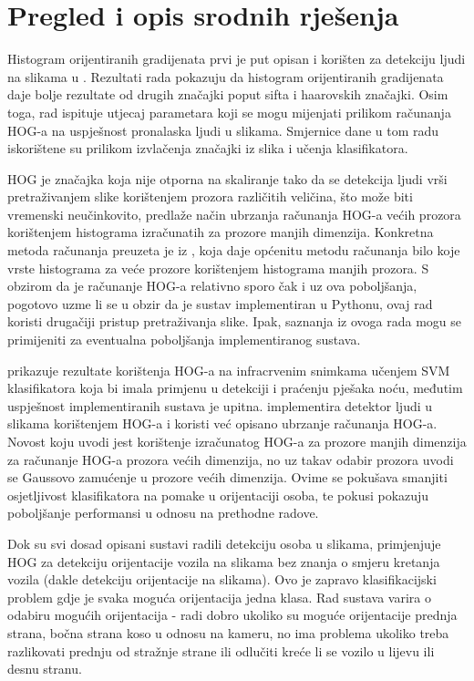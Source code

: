 \documentclass[utf8, seminar, numeric, times]{fer}
\begin{document}
\section{Pregled i opis srodnih rješenja}
Histogram orijentiranih gradijenata prvi je put opisan i korišten za detekciju ljudi na slikama  u \cite{hog}. Rezultati rada pokazuju da histogram orijentiranih gradijenata daje bolje rezultate od drugih značajki poput sifta i haarovskih značajki. Osim toga, rad ispituje utjecaj parametara koji se mogu mijenjati prilikom računanja HOG-a na uspješnost pronalaska ljudi u slikama. Smjernice dane u tom radu iskorištene su prilikom izvlačenja značajki iz slika i učenja klasifikatora.

HOG je značajka koja nije otporna na skaliranje tako da se detekcija ljudi vrši pretraživanjem slike korištenjem prozora različitih veličina, što može biti vremenski neučinkovito, \cite{fast} predlaže način ubrzanja računanja HOG-a većih prozora korištenjem histograma izračunatih za prozore manjih dimenzija. Konkretna metoda računanja preuzeta je iz \cite{hog1}, koja daje općenitu metodu računanja bilo koje vrste histograma za veće prozore korištenjem histograma manjih prozora. S obzirom da je računanje HOG-a relativno sporo čak i uz ova poboljšanja, pogotovo uzme li se u obzir da je sustav implementiran u Pythonu, ovaj rad koristi drugačiji pristup pretraživanja slike. Ipak, saznanja iz ovoga rada mogu se primijeniti za eventualna poboljšanja implementiranog sustava.

\cite{pedestrian} prikazuje rezultate korištenja HOG-a na infracrvenim snimkama učenjem SVM klasifikatora koja bi imala primjenu u detekciji i praćenju pješaka noću, međutim uspješnost implementiranih sustava je upitna.\cite{enhancing} implementira detektor ljudi u slikama korištenjem HOG-a i koristi već opisano ubrzanje računanja HOG-a. Novost koju uvodi jest korištenje izračunatog HOG-a za prozore manjih dimenzija za računanje HOG-a prozora većih dimenzija, no uz takav odabir prozora uvodi se Gaussovo zamućenje u prozore većih dimenzija. Ovime se pokušava smanjiti osjetljivost klasifikatora na pomake u orijentaciji osoba, te pokusi pokazuju poboljšanje performansi u odnosu na prethodne radove.

Dok su svi dosad opisani sustavi radili detekciju osoba u slikama, \cite{visual} primjenjuje HOG za detekciju orijentacije vozila na slikama bez znanja o smjeru kretanja vozila (dakle detekciju orijentacije na slikama). Ovo je zapravo klasifikacijski problem gdje je svaka moguća orijentacija jedna klasa. Rad sustava varira o odabiru mogućih orijentacija - radi dobro ukoliko su moguće orijentacije prednja strana, bočna strana koso u odnosu na kameru, no ima problema ukoliko treba razlikovati prednju od stražnje strane ili odlučiti kreće li se vozilo u lijevu ili desnu stranu.
\end{document}
